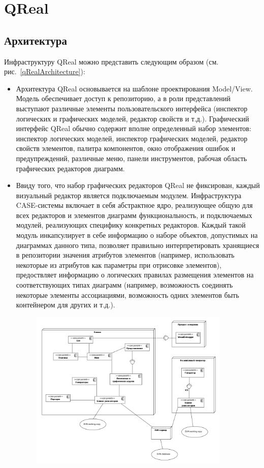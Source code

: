 \documentclass[a4paper]{article}
\begin{document}
\section{QReal}

\subsection{Архитектура}
Инфраструктуру QReal можно представить следующим образом (см. рис.~\ref{qRealArchitecture}):

\begin{itemize}
  \item Архитектура QReal основывается на шаблоне проектирования Model/View. Модель обеспечивает доступ к репозиторию, а в роли представлений выступают различные элементы пользовательского интерфейса (инспектор логических и графических моделей, редактор свойств и т.д.). Графический интерфейс QReal обычно содержит вполне определенный набор элементов: инспектор логических моделей, инспектор графических моделей, редактор свойств элементов, палитра компонентов, окно отображения ошибок и предупреждений, различные меню, панели инструментов, рабочая область графических редакторов диаграмм.
  \item Ввиду того, что набор графических редакторов QReal не фиксирован, каждый визуальный редактор является подключаемым модулем. Инфраструктура CASE-системы включает в себя абстрактное ядро, реализующее общую для всех редакторов и элементов диаграмм функциональность, и подключаемых модулей, реализующих специфику конкретных редакторов. Каждый такой модуль инкапсулирует в себе информацию о наборе объектов, допустимых на диаграммах данного типа, позволяет правильно интерпретировать хранящиеся в репозитории значения атрибутов элементов (например, использовать некоторые из атрибутов как параметры при отрисовке элементов), предоствляет информацию о логических правилах размещения элементов на соответствующих типах диаграмм (например, возможность соединять некоторые элементы ассоциациями, возможность одних элементов быть контейнером для других и т.д.).
\begin{figure} [ht]
  \begin{center}
    \includegraphics[width=0.9\textwidth]{01-architecture.png}

\end{center}
\end{figure}
\end{itemize}
\end{document}
